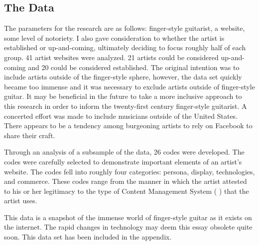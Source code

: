 \documentclass[nofonts,nobib]{tufte-handout}
\newcommand{\textls}[2][5]{%
    \begingroup\addfontfeatures{LetterSpace=#1}#2\endgroup
  }
\renewcommand{\smallcapsspacing}[1]{\textls[10]{#1}}
\renewcommand{\textsc}[1]{\smallcapsspacing{\textsmallcaps{#1}}}
\begin{document}
\subsection{The Data}
\label{sec:data}
The parameters for the research are as follows: finger-style
guitarist, a website, some level of notoriety. I also gave
consideration to whether the artist is established or up-and-coming,
ultimately deciding to focus roughly half of each group. 41 artist
websites were analyzed. 21 artists could be considered up-and-coming
and 20 could be considered established. The original intention was to
include artists outside of the finger-style sphere, however, the data
set quickly became too immense and it was necessary to exclude artists
outside of finger-style guitar. It may be beneficial in the future to
take a more inclusive approach to this research in order to inform the
twenty-first century finger-style guitarist. A concerted effort was
made to include musicians outside of the United States. There appears
to be a tendency among burgeoning artists to rely on Facebook to share
their craft.

Through an analysis of a subsample of the data, 26 codes were
developed. The codes were carefully selected to demonstrate important
elements of an artist's website. The codes fell into roughly four
categories: persona, display, technologies, and commerce. These codes
range from the manner in which the artist attested to his or her
legitimacy to the type of Content Management System (\textsc{cms})
that the artist uses.

This data is a snapshot of the immense world of finger-style guitar as
it exists on the internet. The rapid changes in technology may deem
this essay obsolete quite soon. This data set has been included in
the appendix.
\end{document}
